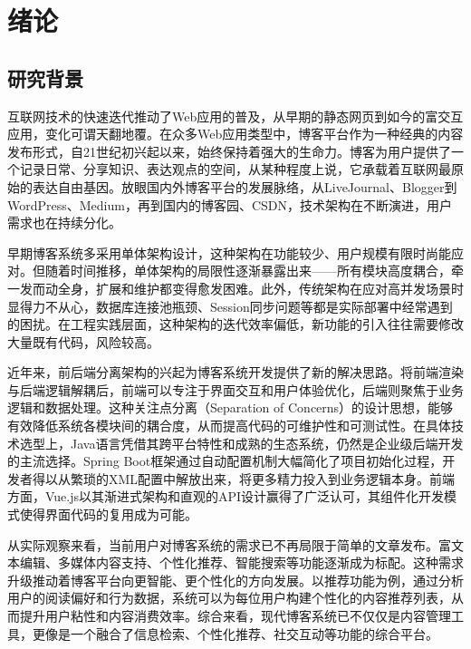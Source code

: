\documentclass[UTF8,AutoFakeBold=1,AutoFakeSlant,zihao=-4]{SCAU}
\begin{document}
\contentpage





\section{绪论}

 \subsection{研究背景}

 互联网技术的快速迭代推动了Web应用的普及，从早期的静态网页到如今的富交互应用，变化可谓天翻地覆。在众多Web应用类型中，博客平台作为一种经典的内容发布形式，自21世纪初兴起以来，始终保持着强大的生命力。博客为用户提供了一个记录日常、分享知识、表达观点的空间，从某种程度上说，它承载着互联网最原始的表达自由基因{\citep{赵荣霞2018}}。放眼国内外博客平台的发展脉络，从LiveJournal、Blogger到WordPress、Medium，再到国内的博客园、CSDN，技术架构在不断演进，用户需求也在持续分化。

 早期博客系统多采用单体架构设计，这种架构在功能较少、用户规模有限时尚能应对。但随着时间推移，单体架构的局限性逐渐暴露出来——所有模块高度耦合，牵一发而动全身，扩展和维护都变得愈发困难{\citep{李杰2018}}。此外，传统架构在应对高并发场景时显得力不从心，数据库连接池瓶颈、Session同步问题等都是实际部署中经常遇到的困扰。在工程实践层面，这种架构的迭代效率偏低，新功能的引入往往需要修改大量既有代码，风险较高。

 近年来，前后端分离架构的兴起为博客系统开发提供了新的解决思路。将前端渲染与后端逻辑解耦后，前端可以专注于界面交互和用户体验优化，后端则聚焦于业务逻辑和数据处理。这种关注点分离（Separation of Concerns）的设计思想，能够有效降低系统各模块间的耦合度，从而提高代码的可维护性和可测试性{\citep{冯岩2018}}。在具体技术选型上，Java语言凭借其跨平台特性和成熟的生态系统，仍然是企业级后端开发的主流选择。Spring Boot框架通过自动配置机制大幅简化了项目初始化过程，开发者得以从繁琐的XML配置中解放出来，将更多精力投入到业务逻辑本身{\citep{罗涛2020}}。前端方面，Vue.js以其渐进式架构和直观的API设计赢得了广泛认可，其组件化开发模式使得界面代码的复用成为可能{\citep{曾广海2016}}。

 从实际观察来看，当前用户对博客系统的需求已不再局限于简单的文章发布。富文本编辑、多媒体内容支持、个性化推荐、智能搜索等功能逐渐成为标配。这种需求升级推动着博客平台向更智能、更个性化的方向发展。以推荐功能为例，通过分析用户的阅读偏好和行为数据，系统可以为每位用户构建个性化的内容推荐列表，从而提升用户粘性和内容消费效率{\citep{颉浪鑫2023}}。综合来看，现代博客系统已不仅仅是内容管理工具，更像是一个融合了信息检索、个性化推荐、社交互动等功能的综合平台。
\end{document}
